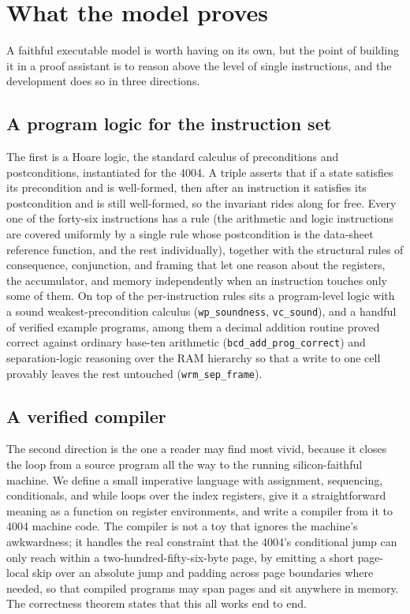 \documentclass[11pt]{amsart}
\theoremstyle{plain}
\theoremstyle{definition}
\newcommand{\code}[1]{\texttt{#1}}
\begin{document}
\section{What the model proves}\label{sec:proofs}

A faithful executable model is worth having on its own, but the point of building it in a proof assistant is to reason above the level of single instructions, and the development does so in three directions.

\subsection{A program logic for the instruction set}

The first is a Hoare logic, the standard calculus of preconditions and postconditions, instantiated for the 4004. A triple asserts that if a state satisfies its precondition and is well-formed, then after an instruction it satisfies its postcondition and is still well-formed, so the invariant rides along for free. Every one of the forty-six instructions has a rule (the arithmetic and logic instructions are covered uniformly by a single rule whose postcondition is the data-sheet reference function, and the rest individually), together with the structural rules of consequence, conjunction, and framing that let one reason about the registers, the accumulator, and memory independently when an instruction touches only some of them. On top of the per-instruction rules sits a program-level logic with a sound weakest-precondition calculus (\code{wp\_soundness}, \code{vc\_sound}), and a handful of verified example programs, among them a decimal addition routine proved correct against ordinary base-ten arithmetic (\code{bcd\_add\_prog\_correct}) and separation-logic reasoning over the RAM hierarchy so that a write to one cell provably leaves the rest untouched (\code{wrm\_sep\_frame}).

\subsection{A verified compiler}

The second direction is the one a reader may find most vivid, because it closes the loop from a source program all the way to the running silicon-faithful machine. We define a small imperative language with assignment, sequencing, conditionals, and while loops over the index registers, give it a straightforward meaning as a function on register environments, and write a compiler from it to 4004 machine code. The compiler is not a toy that ignores the machine's awkwardness; it handles the real constraint that the 4004's conditional jump can only reach within a two-hundred-fifty-six-byte page, by emitting a short page-local skip over an absolute jump and padding across page boundaries where needed, so that compiled programs may span pages and sit anywhere in memory. The correctness theorem states that this all works end to end.
\end{document}
